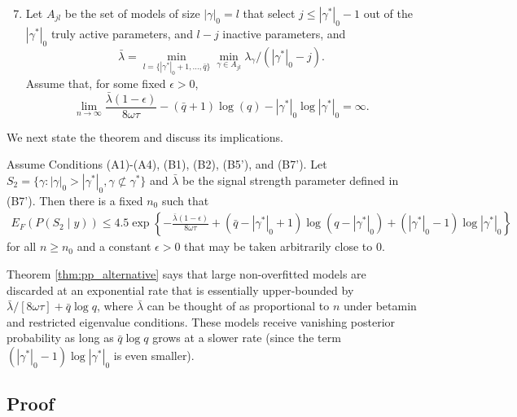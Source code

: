 \begin{enumerate}[leftmargin=*,label=(B\arabic*')]
\setcounter{enumi}{6}
\item Let $A_{jl}$ be the set of models of size $|\gamma|_0=l$ that select $j \leq |\gamma^*|_0-1$ out of the $|\gamma^*|_0$ truly active parameters, and $l-j$ inactive parameters, and
$$\bar{\lambda}= \min_{l=\{|\gamma^*|_0+1,\ldots,\bar{q}\}} \min_{\gamma \in A_{jl}} \lambda_\gamma/(|\gamma^*|_0-j).$$
Assume that, for some fixed $\epsilon >0$,
$$
\lim_{n \rightarrow \infty} \frac{\bar{\lambda}(1-\epsilon)}{ 8\omega\tau} - (\bar{q}+1) \log(q) - |\gamma^*|_0 \log |\gamma^*|_0 = \infty.
$$
\end{enumerate}

We next state the theorem and discuss its implications.

\begin{thm}
Assume Conditions (A1)-(A4), (B1), (B2), (B5'), and (B7'). 
Let $S_2= \{\gamma: |\gamma|_0 > |\gamma^*|_0, \gamma \not\subset \gamma^*\}$
and $\bar{\lambda}$ be the signal strength parameter defined in (B7'). 
Then there is a fixed $n_0$ such that
\begin{align}
E_F(P(S_2 \mid y)) \leq
 4.5 \exp \left\{  -\frac{\bar{\lambda}(1-\epsilon)}{ 8\omega\tau} + (\bar{q}-|\gamma^*|_0+1) \log(q - |\gamma^*|_0) + (|\gamma^*|_0-1) \log |\gamma^*|_0 \right\}
\nonumber
\end{align}
for all $n \geq n_0$ and a constant $\epsilon >0$ that may be taken arbitrarily close to 0.
\label{thm:pp_alternative}
\end{thm}

Theorem \ref{thm:pp_alternative} says that large non-overfitted models are discarded at an exponential rate that is essentially upper-bounded by $\bar{\lambda}/[8 \omega \tau] + \bar{q} \log q$, where $\bar{\lambda}$ can be thought of as proportional to $n$ under betamin and restricted eigenvalue conditions.
These models receive vanishing posterior probability as long as $\bar{q} \log q$ grows at a slower rate (since the term $(|\gamma^*|_0-1) \log |\gamma^*|_0$ is even smaller).



\subsection{Proof}

